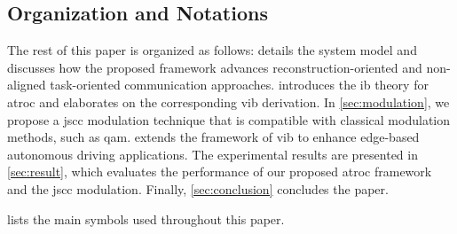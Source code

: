 \subsection{Organization and Notations}
The rest of this paper is organized as follows:  details the system model and discusses how the proposed framework advances reconstruction-oriented and non-aligned task-oriented communication approaches.  introduces the \gls{ib} theory for \gls{atroc} and elaborates on the corresponding \gls{vib} derivation. In \cref{sec:modulation}, we propose a \gls{jscc} modulation technique that is compatible with classical modulation methods, such as \gls{qam}.  extends the framework of \gls{vib} to enhance edge-based autonomous driving applications. The experimental results are presented in \cref{sec:result}, which evaluates the performance of our proposed \gls{atroc} framework and the \gls{jscc} modulation. Finally, \cref{sec:conclusion} concludes the paper.

 lists the main symbols used throughout this paper. 

